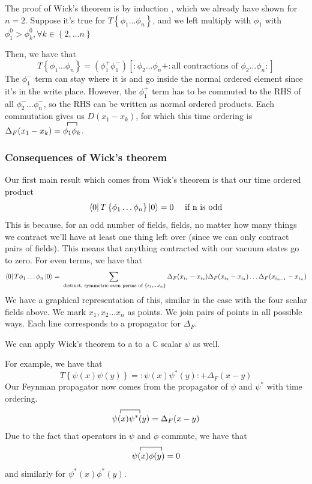 \documentclass[11pt, oneside]{article}   	%
\theoremstyle{newline}
\theoremstyle{newline}
\theoremstyle{newline}
\theoremstyle{newline}
\theoremstyle{newline}
\begin{document}
The proof of Wick's theorem is by induction , which we already have shown for $ n  = 2 $.
Suppose it's true for  $ T \left\{  \phi_1 \dots \phi_{ n } \right\} $, 
and we left multiply with $ \phi_1 $ with $ \phi_ 1 ^ 0 > \phi_{k } ^ 0 , \forall k \in \left\{  2, \dots n  \right\} $

Then, we have that 
\[
T \left\{ \phi_1 \dots \phi_{ n }  \right\} = ( \phi_1 ^ + \phi_1^ - ) \left[  : \phi_2 \dots \phi _{ n } + : \text{all contractions of } \phi_2 \dots \phi _{ n } :  \right]  
\]  The $ \phi_1 ^ - $ term can stay where it is and go inside the 
normal ordered element since it's in the write place. 
However, the $ \phi_1 ^ + $ term has to be commuted to the RHS 
of all $ \phi_2^ -  \dots \phi_{n } ^ - $, so the RHS can be 
written as normal ordered products. 
Each commutation gives us $ D ( x_1 - x_{ k} ) $, for which 
this time ordering is $ \Delta_F ( x_1 - x_{ k } )  = \contraction{}{\phi_1 } {}{\phi_{ k }} \phi_ 1 \phi _{ k }$. 

\subsubsection{Consequences of Wick's theorem}  
Our first main result which comes from Wick's theorem is that
our time ordered product 
\[
\bra{ 0 } T \left\{ \phi_1 \dots \phi_{ n } \right\} \ket{ 0 } = 0 \quad \text{ if n is odd}
\] This is because, for an odd number of fields,  
fields, no matter how many things we contract we'll 
have at least one thing left over (since we can only contract 
pairs of fields). This means that 
anything contracted with our vacuum states go to zero. 
For even terms, we have that 
\[
\bra{ 0 } T \phi_1 \dots \phi_{ n } \ket{ 0 } = \sum_{ \text{ distinct, symmetric even perms of } \left\{ i_1 , \dots i_{ n } \right\} } \Delta_F( x_{ i_1 } - x_{ i _ 2 }) \Delta_F ( x_{ i _ 3 }  - x _{ i _ 4 } ) \dots \Delta_F( x_{ i _{ n - 1 } } - x_{ i _{ n }} )  
\] We have a graphical representation of this, similar in the case with the 
four scalar fields above. We mark $ x_1, x_2 \dots x_{ n }   $  as points. 
We join pairs of points in all possible ways. Each line corresponds to a propagator for $ \Delta_F$. 

We can apply Wick's theorem to a 
to a $ \mathbb{ C} $ scalar $ \psi $ as well. 

For example, we have that 
\[
T \left\{  \psi ( x) \psi ( y )  \right\}  = : \psi ( x) \psi ^ * ( y ) : + \Delta_F ( x- y ) 
\] Our Feynman propagator now comes from the propagator of 
$ \psi $ and $ \psi ^ * $ with time ordering.  
\[
\contraction{} { \psi ( x) } { } { \psi ^ * ( y )  } \psi ( x) \psi ^ * ( y ) = \Delta_F ( x - y ) 
\] Due to the fact that operators in $ \psi $ and $ \phi $ commute, 
we have that 
\[
\contraction{} { \psi ( x) } { } { \psi  * ( y )  } \psi ( x) \phi  ( y ) = 0 
\] and similarly for $ \psi ^ * ( x) \phi ^ * ( y ) $. 
\end{document}
